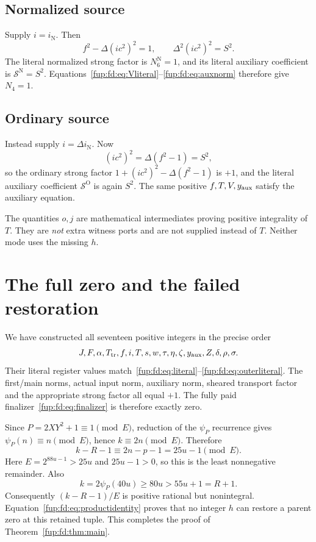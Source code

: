 \documentclass[11pt,letterpaper]{article}
\theoremstyle{definition}\newtheorem{definition}[theorem]{Definition}
\theoremstyle{remark}\newtheorem{remark}[theorem]{Remark}
\newcommand{\tr}{T_{\mathrm{tr}}}\newcommand{\ma}{m_{\mathrm{aux}}}
\begin{document}
\subsection{Normalized source}
Supply $i=i_{\mathrm N}$. Then
\[
 f^2-\Delta(ic^2)^2=1,\qquad
 \Delta^2(ic^2)^2=S^2.
\]
The literal normalized strong factor is $N_6^{\mathrm N}=1$, and its literal auxiliary coefficient is $\mathcal S^{\mathrm N}=S^2$. Equations~\eqref{fup:fd:eq:Vliteral}--\eqref{fup:fd:eq:auxnorm} therefore give $N_4=1$.

\subsection{Ordinary source}
Instead supply $i=\Delta i_{\mathrm N}$. Now
\[
 (ic^2)^2=\Delta(f^2-1)=S^2,
\]
so the ordinary strong factor $1+(ic^2)^2-\Delta(f^2-1)$ is $+1$, and the literal auxiliary coefficient $\mathcal S^{\mathrm O}$ is again $S^2$. The same positive $f,T,V,y_{\mathrm{aux}}$ satisfy the auxiliary equation.

The quantities $o,j$ are mathematical intermediates proving positive integrality of $T$. They are \emph{not} extra witness ports and are not supplied instead of $T$. Neither mode uses the missing $h$.

\section{The full zero and the failed restoration}\label{fup:fd:sec:finish}
We have constructed all seventeen positive integers in the precise order
\[
 J,F,\alpha,\tr,f,i,T,s,w,\tau,\eta,\zeta,\yaux,Z,\delta,\rho,\sigma.
\]
Their literal register values match~\eqref{fup:fd:eq:literal}--\eqref{fup:fd:eq:outerliteral}. The first/main norms, actual input norm, auxiliary norm, sheared transport factor and the appropriate strong factor all equal $+1$. The fully paid finalizer~\eqref{fup:fd:eq:finalizer} is therefore exactly zero.

Since $P=2XY^2+1\equiv1\pmod E$, reduction of the $\psi_P$ recurrence gives $\psi_P(n)\equiv n\pmod E$, hence $k\equiv2n\pmod E$. Therefore
\[
 k-R-1\equiv2n-p-1=25u-1\pmod E.
\]
Here $E=2^{88u-1}>25u$ and $25u-1>0$, so this is the least nonnegative remainder. Also
\[
 k=2\psi_P(40u)\ge80u>55u+1=R+1.
\]
Consequently $(k-R-1)/E$ is positive rational but nonintegral. Equation~\eqref{fup:fd:eq:productidentity} proves that no integer $h$ can restore a parent zero at this retained tuple. This completes the proof of Theorem~\ref{fup:fd:thm:main}.
\end{document}
